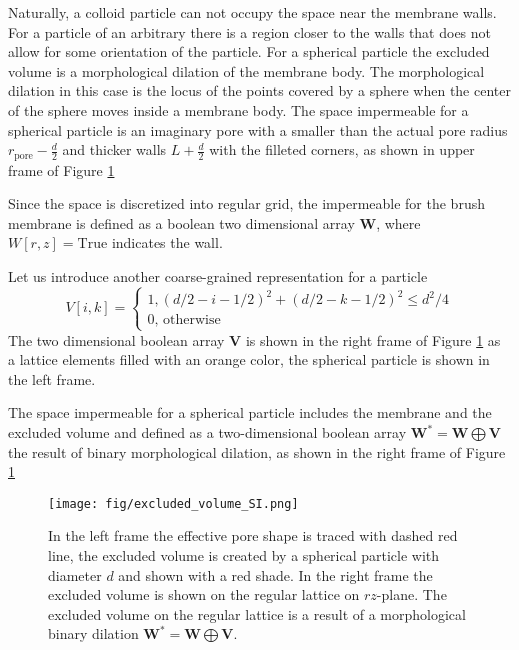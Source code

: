 \documentclass[10pt, a4paper]{article}
\begin{document}
\begin{multicols}{2}
Naturally, a colloid particle can not occupy the space near the membrane walls. 
For a particle of an arbitrary there is a region closer to the walls that does not allow for some orientation of the particle.
For a spherical particle the excluded volume is a morphological dilation of the membrane body.
The morphological dilation in this case is the locus of the points covered by a sphere when the center of the sphere moves inside a membrane body.
The space impermeable for a spherical particle is an imaginary pore with a smaller than the actual pore radius $r_{\textrm{pore}} - \frac{d}{2}$ and thicker walls $L+\frac{d}{2}$ with the filleted corners, as shown in upper frame of Figure \ref{fig:excluded_volume}

Since the space is discretized into regular grid, the impermeable for the brush membrane is defined as a boolean two dimensional array $\bm{W}$, where $W[r,z] = \textrm{True}$ indicates the wall.

Let us introduce another coarse-grained representation for a particle
\begin{equation}
    V[i, k] = 
    \begin{cases}
            \textrm{1}, (d/2-i-1/2)^2 + (d/2-k-1/2)^2 \le d^2/4
            \\
            \textrm{0, otherwise}
        \end{cases}
\end{equation}
The two dimensional boolean array $\bm{V}$ is shown in the right frame of Figure \ref{fig:excluded_volume} as a lattice elements filled with an orange color, the spherical particle is shown in the left frame. 

The space impermeable for a spherical particle includes the membrane and the excluded volume and defined as a two-dimensional boolean array $\bm{W}^{\ast} = \bm{W} \bigoplus \bm{V}$ the result of binary morphological dilation, as shown in the right frame of Figure \ref{fig:excluded_volume}


\begin{figure}[H]
    \centering
    \texttt{[image: fig/excluded\_volume\_SI.png]}
    \caption{
        In the left frame the effective pore shape is traced with dashed red line, the excluded volume is created by a spherical particle with diameter $d$ and shown with a red shade.
        In the right frame the excluded volume is shown on the regular lattice on $rz$-plane.
        The excluded volume on the regular lattice is a result of a morphological binary dilation $\bm{W}^{\ast} = \bm{W} \bigoplus \bm{V}$.
        }
    \label{fig:excluded_volume}
\end{figure}

\end{multicols}
\end{document}
